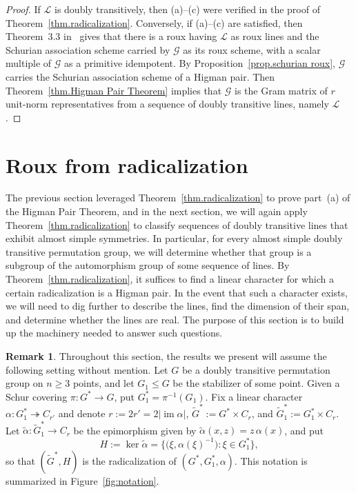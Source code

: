 \documentclass[11pt]{article}
\theoremstyle{definition}
\newtheorem{remark}[theo]{Remark}
\numberwithin{equation}{section}
\begin{document}
\begin{proof}
If $\mathscr{L}$ is doubly transitively, then (a)--(c) were verified in the proof of Theorem~\ref{thm.radicalization}.
Conversely, if (a)--(c) are satisfied, then Theorem~3.3 in~\cite{IversonM:18} gives that there is a roux having $\mathscr{L}$ as roux lines and the Schurian association scheme carried by $\mathcal{G}$ as its roux scheme, with a scalar multiple of $\mathcal{G}$ as a primitive idempotent.
By Proposition~\ref{prop.schurian roux}, $\mathcal{G}$ carries the Schurian association scheme of a Higman pair.
Then Theorem~\ref{thm.Higman Pair Theorem} implies that $\mathcal{G}$ is the Gram matrix of $r$ unit-norm representatives from a sequence of doubly transitive lines, namely $\mathscr{L}$.
\end{proof}



\section{Roux from radicalization}
\label{sec.roux tech}

The previous section leveraged Theorem~\ref{thm.radicalization} to prove part~(a) of the Higman Pair Theorem, and in the next section, we will again apply Theorem~\ref{thm.radicalization} to classify sequences of doubly transitive lines that exhibit almost simple symmetries.
In particular, for every almost simple doubly transitive permutation group, we will determine whether that group is a subgroup of the automorphism group of some sequence of lines.
By Theorem~\ref{thm.radicalization}, it suffices to find a linear character for which a certain radicalization is a Higman pair.
In the event that such a character exists, we will need to dig further to describe the lines, find the dimension of their span, and determine whether the lines are real.
The purpose of this section is to build up the machinery needed to answer such questions.

\begin{remark}
\label{rem.setting}
Throughout this section, the results we present will assume the following setting without mention.
Let $G$ be a doubly transitive permutation group on $n\geq 3$ points, and let $G_1\leq G$ be the stabilizer of some point.
Given a Schur covering $\pi\colon G^* \to G$, put $G^*_1 = \pi^{-1}(G_1)$.
Fix a linear character $\alpha \colon G_1^* \twoheadrightarrow C_{r'}$ and denote $r := 2r' = 2|\operatorname{im} \alpha|$, $\widetilde{G}^* := G^* \times C_r$, and $\widetilde{G}_1^* := G_1^* \times C_r$.
Let $\widetilde{\alpha}\colon \widetilde{G}_1^* \to C_r$ be the epimorphism given by $\widetilde{\alpha}(x,z) = z\, \alpha(x)$, and put
\begin{equation}
\label{eq.H as kernel}
H := \ker \widetilde{\alpha} = \bigl\{ \bigl(\xi,\alpha(\xi)^{-1}\bigr) : \xi \in G_1^* \bigr\},
\end{equation}
so that $(\widetilde{G}^*,H)$ is the radicalization of $(G^*,G_1^*,\alpha)$.
This notation is summarized in Figure~\ref{fig:notation}.
\end{remark}
\end{document}
